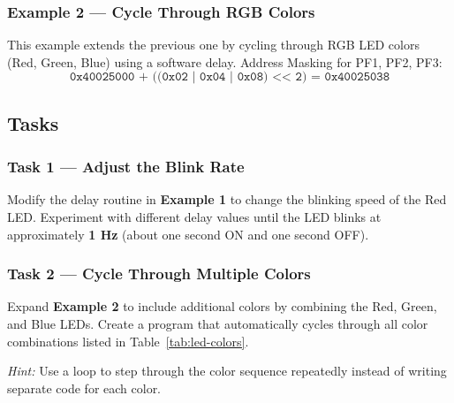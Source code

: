 \subsubsection{Example 2 — Cycle Through RGB Colors}
This example extends the previous one by cycling through RGB LED colors (Red, Green, Blue) using a software delay.
Address Masking for PF1, PF2, PF3:
\[
\texttt{0x40025000 + ((0x02 | 0x04 | 0x08) << 2) = 0x40025038}
\]

\subsection{Tasks}

\subsubsection{Task 1 — Adjust the Blink Rate}
Modify the delay routine in \textbf{Example 1} to change the blinking speed of the Red LED.  
Experiment with different delay values until the LED blinks at approximately \textbf{1 Hz} (about one second ON and one second OFF).

\medskip

\subsubsection{Task 2 — Cycle Through Multiple Colors}
Expand \textbf{Example 2} to include additional colors by combining the Red, Green, and Blue LEDs.  
Create a program that automatically cycles through all color combinations listed in Table~\ref{tab:led-colors}. \\

\smallskip

\noindent\textit{Hint:} Use a loop to step through the color sequence repeatedly instead of writing separate code for each color.
